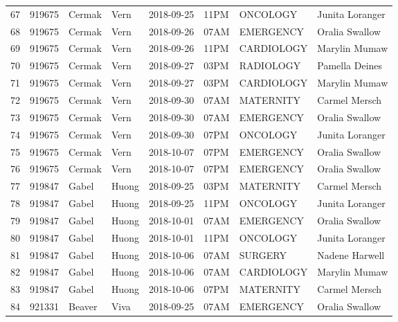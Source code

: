 \documentclass[11pt]{article}
\begin{document}
\begin{tabular}{|l|l|l|l|l|l|l|l|}
	67 &  919675 &      Cermak &      Vern &      2018-09-25 &  11PM &        ONCOLOGY &  Junita Loranger \\
	68 &  919675 &      Cermak &      Vern &      2018-09-26 &  07AM &       EMERGENCY &   Oralia Swallow \\
	69 &  919675 &      Cermak &      Vern &      2018-09-26 &  11PM &      CARDIOLOGY &    Marylin Mumaw \\
	70 &  919675 &      Cermak &      Vern &      2018-09-27 &  03PM &       RADIOLOGY &   Pamella Deines \\
	71 &  919675 &      Cermak &      Vern &      2018-09-27 &  03PM &      CARDIOLOGY &    Marylin Mumaw \\
	72 &  919675 &      Cermak &      Vern &      2018-09-30 &  07AM &       MATERNITY &    Carmel Mersch \\
	73 &  919675 &      Cermak &      Vern &      2018-09-30 &  07AM &       EMERGENCY &   Oralia Swallow \\
	74 &  919675 &      Cermak &      Vern &      2018-09-30 &  07PM &        ONCOLOGY &  Junita Loranger \\
	75 &  919675 &      Cermak &      Vern &      2018-10-07 &  07PM &       EMERGENCY &   Oralia Swallow \\
	76 &  919675 &      Cermak &      Vern &      2018-10-07 &  07PM &       EMERGENCY &   Oralia Swallow \\
	77 &  919847 &       Gabel &     Huong &      2018-09-25 &  03PM &       MATERNITY &    Carmel Mersch \\
	78 &  919847 &       Gabel &     Huong &      2018-09-25 &  11PM &        ONCOLOGY &  Junita Loranger \\
	79 &  919847 &       Gabel &     Huong &      2018-10-01 &  07AM &       EMERGENCY &   Oralia Swallow \\
	80 &  919847 &       Gabel &     Huong &      2018-10-01 &  11PM &        ONCOLOGY &  Junita Loranger \\
	81 &  919847 &       Gabel &     Huong &      2018-10-06 &  07AM &         SURGERY &   Nadene Harwell \\
	82 &  919847 &       Gabel &     Huong &      2018-10-06 &  07AM &      CARDIOLOGY &    Marylin Mumaw \\
	83 &  919847 &       Gabel &     Huong &      2018-10-06 &  07PM &       MATERNITY &    Carmel Mersch \\
	84 &  921331 &      Beaver &      Viva &      2018-09-25 &  07AM &       EMERGENCY &   Oralia Swallow \\

\end{tabular}
\end{document}
